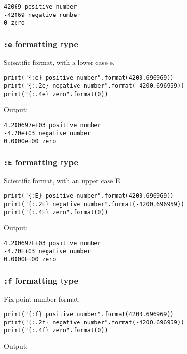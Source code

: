 \documentclass[11pt]{article}
\begin{document}
\begin{verbatim}
42069 positive number
-42069 negative number
0 zero
\end{verbatim}

\subsubsection{\texttt{:e} formatting type}
\label{sec:orgc0ed33b}
Scientific format, with a lower case e.

\begin{verbatim}
print("{:e} positive number".format(4200.696969))
print("{:.2e} negative number".format(-4200.696969))
print("{:.4e} zero".format(0))
\end{verbatim}

 \noindent Output:

\begin{verbatim}
4.200697e+03 positive number
-4.20e+03 negative number
0.0000e+00 zero
\end{verbatim}

\subsubsection{\texttt{:E} formatting type}
\label{sec:org364550f}
Scientific format, with an upper case E.

\begin{verbatim}
print("{:E} positive number".format(4200.696969))
print("{:.2E} negative number".format(-4200.696969))
print("{:.4E} zero".format(0))
\end{verbatim}

 \noindent Output:

\begin{verbatim}
4.200697E+03 positive number
-4.20E+03 negative number
0.0000E+00 zero
\end{verbatim}

\subsubsection{\texttt{:f} formatting type}
\label{sec:org8b594e6}
Fix point number format.

\begin{verbatim}
print("{:f} positive number".format(4200.696969))
print("{:.2f} negative number".format(-4200.696969))
print("{:.4f} zero".format(0))
\end{verbatim}

 \noindent Output:
\end{document}
